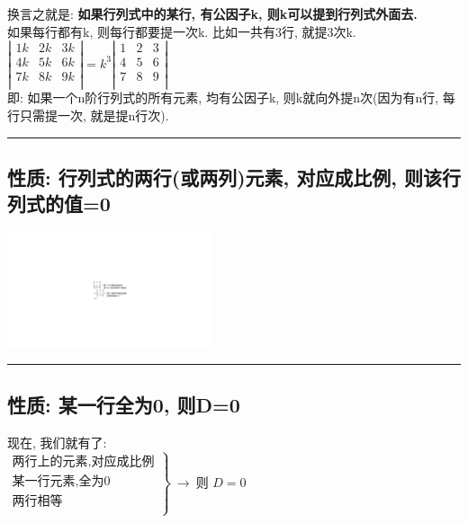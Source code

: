 \documentclass[UTF8]{ctexart}
\begin{document}
	换言之就是: \textbf{如果行列式中的某行, 有公因子k, 则k可以提到行列式外面去.} \\
	
	如果每行都有k, 则每行都要提一次k. 比如一共有3行, 就提3次k. \\
	$
	\left| \begin{matrix}
		1k&		2k&		3k\\
		4k&		5k&		6k\\
		7k&		8k&		9k\\
	\end{matrix} \right|=k^3\left| \begin{matrix}
		1&		2&		3\\
		4&		5&		6\\
		7&		8&		9\\
	\end{matrix} \right|
	$ \\
	
	即: 如果一个n阶行列式的所有元素, 均有公因子k, 则k就向外提n次(因为有n行, 每行只需提一次, 就是提n行次). \\
		
	\hrule
	
	\subsection{性质: 行列式的两行(或两列)元素, 对应成比例, 则该行列式的值=0}

\includegraphics[width=0.45\textwidth]{img/0009.pdf}\\
	
	\hrule
	
	
	\subsection{性质: 某一行全为0, 则D=0 }
	现在, 我们就有了: \\
	
	$
	\left. \begin{array}{r}
		\text{两行上的元素,对应成比例}\\
		\text{某一行元素,全为}0\\
		\text{两行相等}\\
	\end{array} \right\} \ →\ \text{则\ }D=0
	$\\
	
\end{document}
